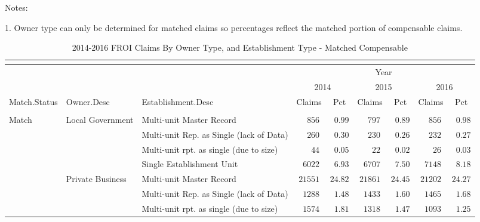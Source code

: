 \documentclass[9pt, oneside]{article}   	%
\begin{document}
    \begin{tablenotes}
      \small
      Notes:
      \\
      \item 1. Owner type can only be determined for matched claims so percentages reflect the matched portion of compensable claims.\\
    \end{tablenotes}
    

\begin{longtable}{lllcccccc}
\caption{2014-2016 FROI Claims By Owner Type, and Establishment Type - Matched Compensable}\\ 
  \label{Table: Zero.3}\\
  \hline    
                          \toprule
& & & \multicolumn{6}{c}{Year} \\ 
& & & \multicolumn{2}{c}{2014} & \multicolumn{2}{c}{2015} & \multicolumn{2}{c}{2016} \\ 
Match.Status & Owner.Desc & Establishment.Desc & Claims & Pct & Claims & Pct & Claims & \multicolumn{1}{c}{Pct} \\ 
\midrule\\ [-1\normalbaselineskip]\hline\endhead\hline\endfoot
Match & Local Government & Multi-unit Master Record  & $\phantom{00}856$ & $\phantom{0}0.99$ & $\phantom{00}797$ & $\phantom{0}0.89$ & $\phantom{00}856$ & $\phantom{0}0.98$ \\
 &  & Multi-unit Rep. as Single (lack of Data)  & $\phantom{00}260$ & $\phantom{0}0.30$ & $\phantom{00}230$ & $\phantom{0}0.26$ & $\phantom{00}232$ & $\phantom{0}0.27$ \\
 &  & Multi-unit rpt. as single (due to size)  & $\phantom{000}44$ & $\phantom{0}0.05$ & $\phantom{000}22$ & $\phantom{0}0.02$ & $\phantom{000}26$ & $\phantom{0}0.03$ \\
 &  & Single Establishment Unit  & $\phantom{0}6022$ & $\phantom{0}6.93$ & $\phantom{0}6707$ & $\phantom{0}7.50$ & $\phantom{0}7148$ & $\phantom{0}8.18$ \\
 & Private Business & Multi-unit Master Record  & $21551$ & $24.82$ & $21861$ & $24.45$ & $21202$ & $24.27$ \\
 &  & Multi-unit Rep. as Single (lack of Data)  & $\phantom{0}1288$ & $\phantom{0}1.48$ & $\phantom{0}1433$ & $\phantom{0}1.60$ & $\phantom{0}1465$ & $\phantom{0}1.68$ \\
 &  & Multi-unit rpt. as single (due to size)  & $\phantom{0}1574$ & $\phantom{0}1.81$ & $\phantom{0}1318$ & $\phantom{0}1.47$ & $\phantom{0}1093$ & $\phantom{0}1.25$ \\

\end{longtable}
\end{document}
